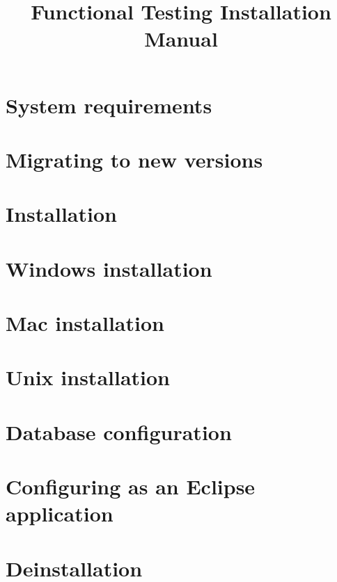 
%
\title{Functional Testing Installation Manual}
\author*{}{}
\maketitle


\tableofcontents
\renewcommand{\bxcomment}[2]{}%
\clearpage
\setcounter{secnumdepth}{2}%

\chapter{System requirements}

\clearpage
\chapter{Migrating to new versions}

\clearpage
\chapter{Installation}

\clearpage
\chapter{Windows installation}

\clearpage
\chapter{Mac installation}

\clearpage
\chapter{Unix installation}
\label{Unix}

\clearpage
\chapter{Database configuration}


\chapter{Configuring as an Eclipse application}

\clearpage
\chapter{Deinstallation}

